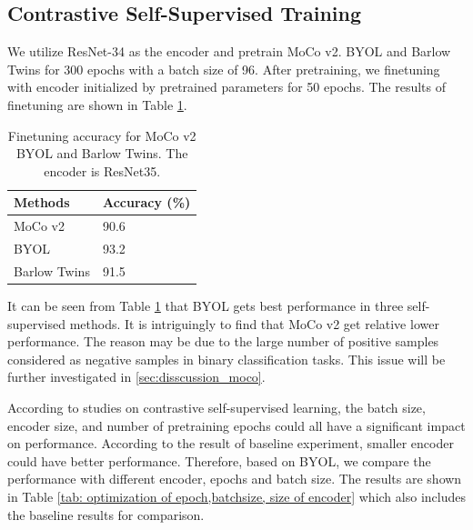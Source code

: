 \documentclass[conference]{IEEEtran}
\begin{document}
\subsection{Contrastive Self-Supervised Training}
\label{sec:contrastive_ssl_ex}
We utilize ResNet-34 as the encoder and pretrain MoCo v2. BYOL and Barlow Twins for 300 epochs with a batch size of 96. After pretraining, we finetuning with encoder initialized by pretrained parameters for 50 epochs. The results of finetuning are shown in Table \ref{tab:finetune_methods}.
\begin{table}[tb]
\caption{Finetuning accuracy for MoCo v2 BYOL and Barlow Twins. The encoder is ResNet35.}
\centering
\begin{tabular}{l|l}
\hline
Methods    & Accuracy (\%) \\ \hline
MoCo v2    & 90.6          \\
BYOL       & 93.2           \\
Barlow Twins     & 91.5   \\
\hline   
\end{tabular}
\label{tab:finetune_methods}
\end{table}

It can be seen from Table \ref{tab:finetune_methods} that BYOL gets best performance in three self-supervised methods. It is intriguingly to find that MoCo v2 get relative lower performance. The reason may be due to the large number of positive samples considered as negative samples in binary classification tasks. This issue will be further investigated in \ref{sec:disscussion_moco}.

According to studies on contrastive self-supervised learning, the batch size, encoder size, and number of pretraining epochs could all have a significant impact on performance. 
According to the result of baseline experiment, smaller encoder could have better performance. Therefore, based on BYOL, we compare the performance with different encoder, epochs and batch size. The results are shown in Table \ref{tab: optimization of epoch,batchsize, size of encoder} which also includes the baseline results for comparison. 
\end{document}
